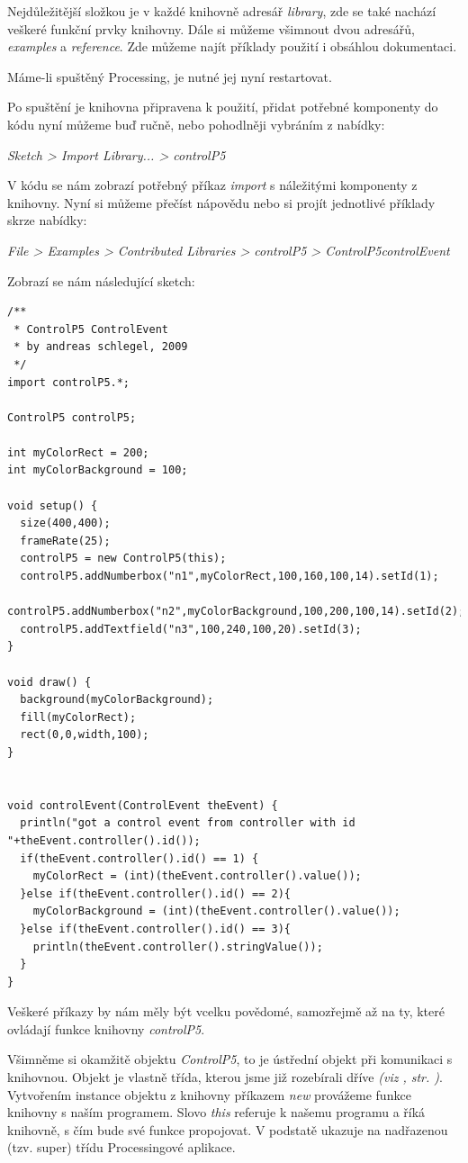 \documentclass[10pt]{book}
\newcommand{\vyraz}[1]{\textit{\gls{#1}}\index{#1}\label{#1}}
\newcommand{\odkaz}[1]{\textit{(viz \nameref{#1}, str. \pageref*{#1})}}
\begin{document}
Nejdůležitější složkou je v každé knihovně adresář {\em library}, zde se také nachází veškeré funkční prvky knihovny. Dále si můžeme všimnout dvou adresářů, {\em examples} a {\em reference}. Zde můžeme najít příklady použití i obsáhlou dokumentaci.

Máme-li spuštěný Processing, je nutné jej nyní restartovat.

Po spuštění je knihovna připravena k použití, přidat potřebné komponenty do kódu nyní můžeme buď ručně, nebo pohodlněji vybráním z nabídky:

{\em Sketch > Import Library... > controlP5}

V kódu se nám zobrazí potřebný příkaz \vyraz{import} s náležitými komponenty z knihovny. Nyní si můžeme přečíst nápovědu nebo si projít jednotlivé příklady skrze nabídky:

{\em File > Examples > Contributed Libraries > controlP5 > ControlP5controlEvent}

Zobrazí se nám následující sketch:

 
\begin{lstlisting}
/**
 * ControlP5 ControlEvent
 * by andreas schlegel, 2009
 */
import controlP5.*;

ControlP5 controlP5;

int myColorRect = 200;
int myColorBackground = 100;

void setup() {
  size(400,400);
  frameRate(25);
  controlP5 = new ControlP5(this);
  controlP5.addNumberbox("n1",myColorRect,100,160,100,14).setId(1);
  controlP5.addNumberbox("n2",myColorBackground,100,200,100,14).setId(2);
  controlP5.addTextfield("n3",100,240,100,20).setId(3);
}

void draw() {
  background(myColorBackground);
  fill(myColorRect);
  rect(0,0,width,100);
}


void controlEvent(ControlEvent theEvent) {
  println("got a control event from controller with id "+theEvent.controller().id());
  if(theEvent.controller().id() == 1) {
    myColorRect = (int)(theEvent.controller().value());
  }else if(theEvent.controller().id() == 2){
    myColorBackground = (int)(theEvent.controller().value());
  }else if(theEvent.controller().id() == 3){
    println(theEvent.controller().stringValue());
  }
}
\end{lstlisting}

Veškeré příkazy by nám měly být vcelku povědomé, samozřejmě až na ty, které ovládají funkce knihovny {\em controlP5}.

Všimněme si okamžitě objektu {\em ControlP5}, to je ústřední objekt při komunikaci s knihovnou. Objekt je vlastně třída, kterou jsme již rozebírali dříve \odkaz{Třída a objekt}. Vytvořením instance objektu z knihovny příkazem \vyraz{new} provážeme funkce knihovny s naším programem. Slovo \vyraz{this} referuje k našemu programu a říká knihovně, s čím bude své funkce propojovat. V podstatě ukazuje na nadřazenou (tzv. super) třídu Processingové aplikace.
\end{document}

